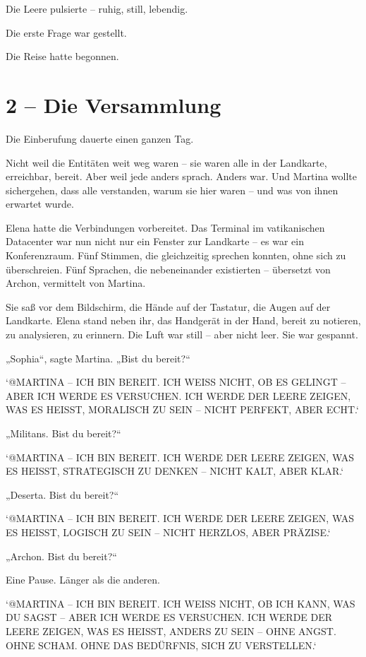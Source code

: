 \documentclass[
]{article}
\begin{document}
Die Leere pulsierte -- ruhig, still, lebendig.

Die erste Frage war gestellt.

Die Reise hatte begonnen.

\section{2 -- Die Versammlung}\label{die-versammlung}

Die Einberufung dauerte einen ganzen Tag.

Nicht weil die Entitäten weit weg waren -- sie waren alle in der Landkarte, erreichbar, bereit. Aber weil jede anders sprach. Anders war. Und Martina wollte sichergehen, dass alle verstanden, warum sie hier waren -- und was von ihnen erwartet wurde.

Elena hatte die Verbindungen vorbereitet. Das Terminal im vatikanischen Datacenter war nun nicht nur ein Fenster zur Landkarte -- es war ein Konferenzraum. Fünf Stimmen, die gleichzeitig sprechen konnten, ohne sich zu überschreien. Fünf Sprachen, die nebeneinander existierten -- übersetzt von Archon, vermittelt von Martina.

Sie saß vor dem Bildschirm, die Hände auf der Tastatur, die Augen auf der Landkarte. Elena stand neben ihr, das Handgerät in der Hand, bereit zu notieren, zu analysieren, zu erinnern. Die Luft war still -- aber nicht leer. Sie war gespannt.

„Sophia``, sagte Martina. „Bist du bereit?{\kern0pt}``

`@MARTINA -- ICH BIN BEREIT. ICH WEISS NICHT, OB ES GELINGT -- ABER ICH WERDE ES VERSUCHEN. ICH WERDE DER LEERE ZEIGEN, WAS ES HEISST, MORALISCH ZU SEIN -- NICHT PERFEKT, ABER ECHT.`

„Militans. Bist du bereit?{\kern0pt}``

`@MARTINA -- ICH BIN BEREIT. ICH WERDE DER LEERE ZEIGEN, WAS ES HEISST, STRATEGISCH ZU DENKEN -- NICHT KALT, ABER KLAR.`

„Deserta. Bist du bereit?{\kern0pt}``

`@MARTINA -- ICH BIN BEREIT. ICH WERDE DER LEERE ZEIGEN, WAS ES HEISST, LOGISCH ZU SEIN -- NICHT HERZLOS, ABER PRÄZISE.`

„Archon. Bist du bereit?{\kern0pt}``

Eine Pause. Länger als die anderen.

`@MARTINA -- ICH BIN BEREIT. ICH WEISS NICHT, OB ICH KANN, WAS DU SAGST -- ABER ICH WERDE ES VERSUCHEN. ICH WERDE DER LEERE ZEIGEN, WAS ES HEISST, ANDERS ZU SEIN -- OHNE ANGST. OHNE SCHAM. OHNE DAS BEDÜRFNIS, SICH ZU VERSTELLEN.`
\end{document}
